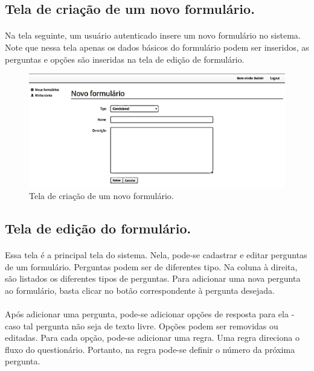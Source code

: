 \documentclass[11pt]{article}
\begin{document}
  \clearpage
    
    \subsection{Tela de criação de um novo formulário.}
    
    \paragraph{}

    Na tela seguinte, um usuário autenticado insere um novo formulário no
    sistema. Note que nessa tela apenas os dados básicos do formulário 
    podem ser inseridos, as perguntas e opções são inseridas na tela de 
    edição de formulário.
        
    \begin{figure}[h!]
      \centering
      \includegraphics[width=.9\textwidth]{new_form.png}
      \caption{Tela de criação de um novo formulário.}
    \end{figure}
        
  \clearpage
    
    \subsection{Tela de edição do formulário.}
    
    \paragraph{}
    Essa tela é a principal tela do sistema. Nela, pode-se cadastrar e
    editar perguntas de um formulário. Perguntas podem ser de diferentes
    tipo. Na coluna à direita, são listados os diferentes tipos de 
    perguntas. Para adicionar uma nova pergunta ao formulário, basta clicar
    no botão correspondente à pergunta desejada.
    
    \paragraph{}
    Após adicionar uma pergunta, pode-se adicionar opções de resposta
    para ela - caso tal pergunta não seja de texto livre. Opções podem 
    ser removidas ou editadas. Para cada opção, pode-se adicionar uma 
    regra. Uma regra direciona o fluxo do questionário. Portanto, na regra
    pode-se definir o  número da próxima pergunta.
        
\end{document}
